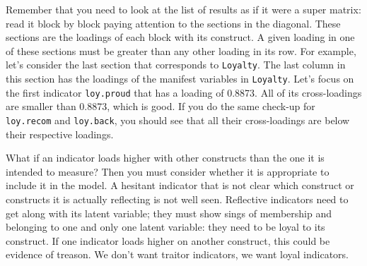 \documentclass[12pt]{book}\usepackage{graphicx, color}
\newcommand{\code}[1]{\texttt{#1}}
\begin{document}
Remember that you need to look at the list of results as if it were a super matrix: read it block by block paying attention to the sections in the diagonal. These sections are the loadings of each block with its construct. A given loading in one of these sections must be greater than any other loading in its row. For example, let's consider the last section that corresponds to \code{Loyalty}. The last column in this section has the loadings of the manifest variables in \code{Loyalty}. Let's focus on the first indicator \code{loy.proud} that has a loading of 0.8873. All of its cross-loadings are smaller than 0.8873, which is good. If you do the same check-up for \code{loy.recom} and \code{loy.back}, you should see that all their cross-loadings are below their respective loadings.

What if an indicator loads higher with other constructs than the one it is intended to measure? Then you must consider whether it is appropriate to include it in the model. A hesitant indicator that is not clear which construct or constructs it is actually reflecting is not well seen. Reflective indicators need to get along with its latent variable; they must show sings of membership and belonging to one and only one latent variable: they need to be loyal to its construct. If one indicator loads higher on another construct, this could be evidence of treason. We don't want traitor indicators, we want loyal indicators.
\end{document}
